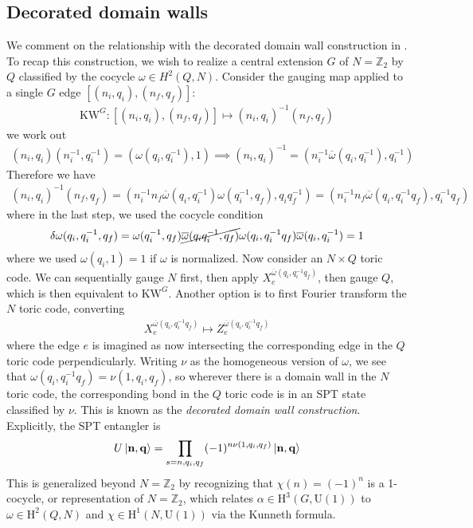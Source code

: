 \documentclass{article}
\theoremstyle{definition}
\theoremstyle{definition}
\newcommand{\Z}{\mathbb Z}
\newcommand{\cohom}{\mathrm H}
\newcommand{\KW}{\mathrm{KW}}
\newcommand{\U}{\mathrm{U}}
\begin{document}
\subsection{Decorated domain walls}
We comment on the relationship with the decorated domain wall
construction in \cite{Tantivasadakarn_2023}. To recap this construction, we wish to
realize a central extension $G$ of $N = \Z_2$ by $Q$ classified by the cocycle $\omega
\in H^2(Q, N)$. Consider the gauging map applied to a single $G$ edge $[(n_i,
q_i), (n_f, q_f)]$:
\begin{align}
  \KW^G: [(n_i, q_i), (n_f, q_f)] \mapsto (n_i, q_i)^{-1}(n_f, q_f)
\end{align}
we work out
\begin{align}
  (n_i, q_i)(n_i^{-1}, q_i^{-1}) = (\omega(q_i, q_i^{-1}), 1) \implies (n_i, q_i)^{-1} = (n_i^{-1}\overline \omega(q_i, q_i^{-1}), q_i^{-1})
\end{align}
Therefore we have
\begin{align}
  (n_i, q_i)^{-1}(n_f, q_f) = (n_i^{-1}n_f\overline \omega(q_i, q_i^{-1})\omega(q_i^{-1}, q_f), q_iq_f^{-1}) = (n_i^{-1}n_f \overline \omega(q_i, q_i^{-1}q_f), q_i^{-1}q_f)
\end{align}
where in the last step, we used the cocycle condition
\begin{align}
  \delta \omega(q_i, q_i^{-1}, q_f) = \omega(q_i^{-1}, q_f)\cancel{\overline \omega(q_iq_i^{-1}, q_f)} \omega(q_i, q_i^{-1}q_f) \overline \omega(q_i, q_i^{-1}) = 1
\end{align}
where we used $\omega(q_i, 1) = 1$ if $\omega$ is normalized. Now consider an
$N\times Q$ toric code. We can sequentially gauge $N$ first, then apply
$X_{e}^{\overline \omega(q_i, q_i^{-1} q_f)}$, then gauge $Q$, which is then
equivalent to $\KW^G$. Another option is to first Fourier transform the $N$
toric code, converting
\begin{align}
  X_e^{\overline \omega(q_i, q_i^{-1}q_f)} \mapsto Z_e^{\overline \omega(q_i, q_i^{-1}q_f)}
\end{align}
where the edge $e$ is imagined as now intersecting the corresponding edge in the
$Q$ toric code perpendicularly. Writing $\nu$ as the homogeneous version of
$\omega$, we see that $\omega(q_i, q_i^{-1}q_f) = \nu(1, q_i, q_f)$, so
wherever there is a domain wall in the $N$ toric code, the corresponding bond in
the $Q$ toric code is in an SPT state classified by $\nu$. This is known as the
\textit{decorated domain wall construction}. Explicitly, the SPT entangler is
\begin{align}
U\ket{\vb n, \vb q} = \prod_{s = n, q_i, q_f} (-1)^{n\nu(1, q_i, q_f)} \ket{\vb n, \vb q}
\end{align}
This is generalized beyond $N = \Z_2$ by recognizing that $\chi(n) = (-1)^{n}$
is a 1-cocycle, or representation of $N = \Z_2$, which relates $\alpha \in
\cohom^3(G, \U(1))$  to $\omega \in \cohom^2(Q, N)$ and $\chi \in \cohom^1(N,
\U(1))$ via the Kunneth formula.
\end{document}
